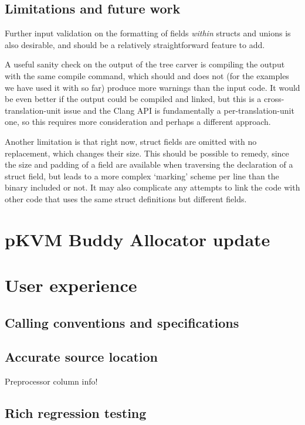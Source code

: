 \section{Limitations and future work}

Further input validation on the formatting of fields \emph{within} structs and
unions is also desirable, and should be a relatively straightforward feature to
add.

A useful sanity check on the output of the tree carver is compiling the output
with the same compile command, which should and does not (for the examples we
have used it with so far) produce more warnings than the input code. It would
be even better if the output could be compiled and linked, but this is a
cross-translation-unit issue and the Clang API is fundamentally a
per-translation-unit one, so this requires more consideration and perhaps a
different approach.

Another limitation is that right now, struct fields are omitted with no
replacement, which changes their size. This should be possible to remedy, since
the size and padding of a field are available when traversing the declaration
of a struct field, but leads to a more complex `marking' scheme per line than
the binary included or not. It may also complicate any attempts to link the
code with other code that uses the same struct definitions but different
fields.

\chapter{pKVM Buddy Allocator update}\label{chap:buddy}

\chapter{User experience}

\section{Calling conventions and specifications}

\section{Accurate source location}

Preprocessor column info!

\section{Rich regression testing}

